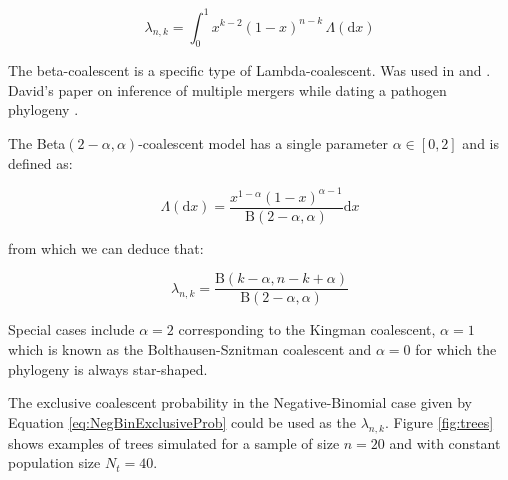 \documentclass{article}
\begin{document}
\begin{equation}
    \lambda_{n,k} = \int_{0}^{1}{x^{k-2}(1-x)^{n-k}\,\Lambda(\mathrm{d} x)}
\end{equation}

The beta-coalescent \citep{schweinsbergCoalescentProcessesObtained2003} is a specific type of Lambda-coalescent. 
Was used in \citep{Hoscheit2019} and \citep{Menardo2021}. 
David's paper on inference of multiple mergers while dating a pathogen phylogeny \citep{Helekal2024}.

The Beta$(2-\alpha,\alpha)$-coalescent model \citep{schweinsbergCoalescentProcessesObtained2003}
has a single parameter $\alpha \in [0,2]$ and is defined as:

\begin{equation}
\Lambda(\mathrm{d}x)=\frac{x^{1-\alpha}(1-x)^{\alpha-1}}{\mathrm{B}(2-\alpha,\alpha)}\mathrm{d}x
\end{equation}

from which we can deduce that:

\begin{equation}
\lambda_{n,k}=\frac{\mathrm{B}(k-\alpha,n-k+\alpha)}{\mathrm{B}(2-\alpha,\alpha)}
\end{equation}

Special cases include $\alpha=2$ corresponding to the Kingman coalescent,
$\alpha=1$ which is known as the Bolthausen-Sznitman coalescent
and $\alpha=0$ for which the phylogeny is always star-shaped.

The exclusive coalescent probability in the Negative-Binomial case 
given by Equation \eqref{eq:NegBinExclusiveProb} could be used as the $\lambda_{n,k}$.
Figure \ref{fig:trees} shows examples of trees simulated for a sample of size $n=20$ and
with constant population size $N_t=40$. 
\end{document}
